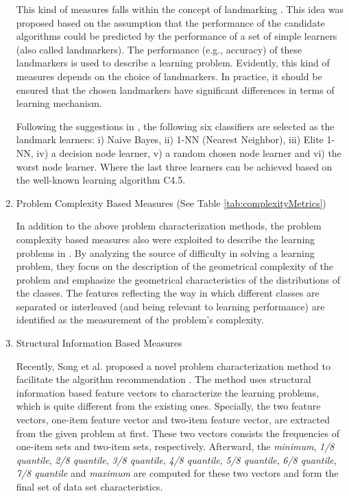 \documentclass[acmsmall]{acmart}
\begin{document}
\begin{enumerate}
	This kind of measures falls within the concept of landmarking
	\cite{Pfahringer00meta,Bensusan2000casa,jain2000statistical,duin2004characterization}.
	This idea was proposed based on the assumption that the performance
	of the candidate algorithms could be predicted by the performance of
	a set of simple learners (also called landmarkers). The performance
	(e.g., accuracy) of these landmarkers is used to describe a learning
	problem. Evidently, this kind of measures depends on the choice of
	landmarkers. In practice, it should be ensured that the chosen
	landmarkers have significant differences in terms of learning
	mechanism.
	
	\quad Following the suggestions in
	\cite{Pfahringer00meta,Bensusan2000casa}, the following six classifiers are
	selected as the landmark learners: i) Naive Bayes, ii) 1-NN (Nearest Neighbor),
	iii) Elite 1-NN, iv) a decision node learner, v)
	a random chosen node learner and  vi) the worst node learner.
	Where the last three learners can be achieved based on the
	well-known learning algorithm C4.5.
	
	\item {Problem Complexity Based Measures} (See Table
	\ref{tab:complexityMetrics})
	
	In addition to the above problem characterization methods, the
	problem complexity based measures also were exploited to describe
	the learning problems in
	\cite{bernado2005domain,ho2002complexity,elizondo2009estimation,ho2000complexity}.
	By analyzing the source of difficulty in solving a learning problem,
	they focus on the description of the geometrical complexity of the
	problem and emphasize the geometrical characteristics of the
	distributions of the classes. The features reflecting the way in
	which different classes are separated or interleaved (and being
	relevant to learning performance) are identified as the measurement
	of the problem's complexity.
	
	\item {Structural Information Based Measures}
	
	Recently, Song et al. proposed a novel problem characterization
	method to facilitate the algorithm recommendation
	\cite{song2012automatic}. The method uses structural information
	based feature vectors to characterize the learning problems, which
	is quite different from the existing ones. Specially, the two
	feature vectors, one-item feature vector and two-item feature
	vector, are extracted from the given problem at first. These two vectors
	consists the frequencies of one-item sets and two-item sets,
	respectively. Afterward, the \emph{minimum}, \emph{1/8
		quantile}, \emph{2/8 quantile}, \emph{3/8 quantile}, \emph{4/8
		quantile}, \emph{5/8 quantile}, \emph{6/8 quantile}, \emph{7/8
		quantile} and \emph{maximum} are computed for these two vectors
	and form the final set of data set characteristics.
\end{enumerate}
\end{document}
